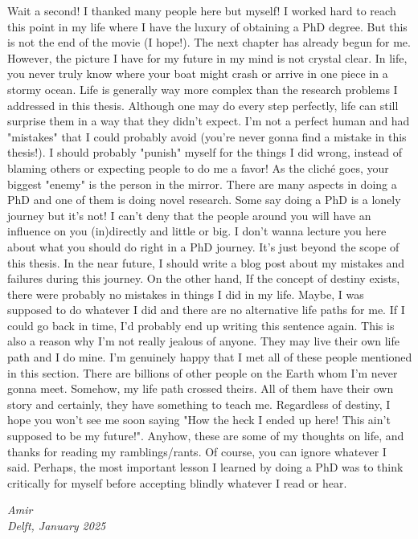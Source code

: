 Wait a second! I thanked many people here but myself! I worked hard to reach this point in my life where I have the luxury of obtaining a PhD degree. But this is not the end of the movie (I hope!). The next chapter has already begun for me. However, the picture I have for my future in my mind is not crystal clear. In life, you never truly know where your boat might crash or arrive in one piece in a stormy ocean. Life is generally way more complex than the research problems I addressed in this thesis. Although one may do every step perfectly, life can still surprise them in a way that they didn't expect. I'm not a perfect human and had "mistakes" that I could probably avoid (you're never gonna find a mistake in this thesis!). I should probably "punish" myself for the things I did wrong, instead of blaming others or expecting people to do me a favor! As the cliché goes, your biggest "enemy" is the person in the mirror. There are many aspects in doing a PhD and one of them is doing novel research. Some say doing a PhD is a lonely journey but it's not! I can't deny that the people around you will have an influence on you (in)directly and little or big. I don't wanna lecture you here about what you should do right in a PhD journey. It's just beyond the scope of this thesis. In the near future, I should write a blog post about my mistakes and failures during this journey. On the other hand, If the concept of destiny exists, there were probably no mistakes in things I did in my life. Maybe, I was supposed to do whatever I did and there are no alternative life paths for me. If I could go back in time, I'd probably end up writing this sentence again. This is also a reason why I'm not really jealous of anyone. They may live their own life path and I do mine. I'm genuinely happy that I met all of these people mentioned in this section. There are billions of other people on the Earth whom I'm never gonna meet. Somehow, my life path crossed theirs. All of them have their own story and certainly, they have something to teach me. Regardless of destiny, I hope you won't see me soon saying "How the heck I ended up here! This ain't supposed to be my future!". Anyhow, these are some of my thoughts on life, and thanks for reading my ramblings/rants. Of course, you can ignore whatever I said. Perhaps, the most important lesson I learned by doing a PhD was to think critically for myself before accepting blindly whatever I read or hear.

\begin{flushright}
{\makeatletter\itshape
    Amir \\
    Delft,  January 2025
\makeatother}
\end{flushright}


